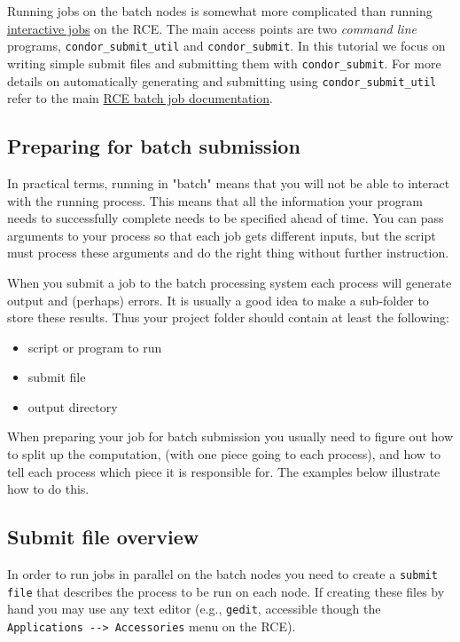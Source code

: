 \documentclass[11pt]{article}
\begin{document}
Running jobs on the batch nodes is somewhat more complicated than running \hyperref[sec:orgbb95ba7]{interactive jobs} on the RCE. The main access points are two \emph{command line} programs, \texttt{condor\_submit\_util} and \texttt{condor\_submit}. In this tutorial we focus on writing simple submit files and submitting them with \texttt{condor\_submit}. For more details on automatically generating and submitting using \texttt{condor\_submit\_util} refer to the main \href{http://projects.iq.harvard.edu/rce/book/batch-processing-basics}{RCE batch job documentation}. 

\subsection{Preparing for batch submission}
\label{sec:org0e916d6}

In practical terms, running in "batch" means that you will not be able to interact with the running process. This means that all the information your program needs to successfully complete needs to be specified ahead of time. You can pass arguments to your process so that each job gets different inputs, but the script must process these arguments and do the right thing without further instruction.

When you submit a job to the batch processing system each process will generate output and (perhaps) errors. It is usually a good idea to make a sub-folder to store these results. Thus your project folder should contain at least the following:
\begin{itemize}
\item script or program to run
\item submit file
\item output directory
\end{itemize}

When preparing your job for batch submission you usually need to figure out how to split up the computation, (with one piece going to each process), and how to tell each process which piece it is responsible for. The examples below illustrate how to do this.

\subsection{Submit file overview}
\label{sec:org7cbfb94}
In order to run jobs in parallel on the batch nodes you need to create a \texttt{submit file} that describes the process to be run on each node. If creating these files by hand you may use any text editor (e.g., \texttt{gedit}, accessible though the \texttt{Applications -{}-> Accessories} menu on the RCE). 
\end{document}
